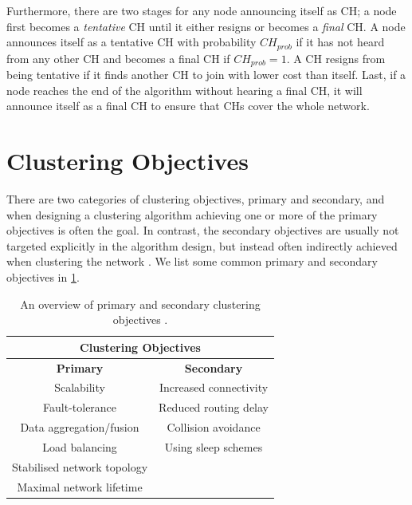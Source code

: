 Furthermore, there are two stages for any node announcing itself as CH; a node first becomes a \textit{tentative} CH until it either resigns or becomes a \textit{final} CH. A node announces itself as a tentative CH with probability $CH_{prob}$ if it has not heard from any other CH and becomes a final CH if $CH_{prob} = 1$. A CH resigns from being tentative if it finds another CH to join with lower cost than itself. Last, if a node reaches the end of the algorithm without hearing a final CH, it will announce itself as a final CH to ensure that CHs cover the whole network.



\section{Clustering Objectives}
\label{sec:clustering-objectives}
There are two categories of clustering objectives, primary and secondary, and when designing a clustering algorithm achieving one or more of the primary objectives is often the goal. In contrast, the secondary objectives are usually not targeted explicitly in the algorithm design, but instead often indirectly achieved when clustering the network \cite{Afsar2014-clustering-survey}. We list some common primary and secondary objectives in \cref{table:clustering-objective}.

\begin{table}[b]
\centering
\caption{An overview of primary and secondary clustering objectives \cite{Afsar2014-clustering-survey}.}
\label{table:clustering-objective}
\begin{tabular}{cc}
\multicolumn{2}{c}{{\textbf{Clustering Objectives}}}                   \\ \hline
\multicolumn{1}{c|}{\textbf{Primary}}            & \textbf{Secondary}      \\ \hline
\multicolumn{1}{c|}{Scalability}                 & Increased connectivity  \\
\multicolumn{1}{c|}{Fault-tolerance}             & Reduced routing delay   \\
\multicolumn{1}{c|}{Data aggregation/fusion}     & Collision avoidance     \\
\multicolumn{1}{c|}{Load balancing}              & Using sleep schemes \\
\multicolumn{1}{c|}{Stabilised network topology} &                         \\
\multicolumn{1}{c|}{Maximal network lifetime}    &                        
\end{tabular}
\end{table}


